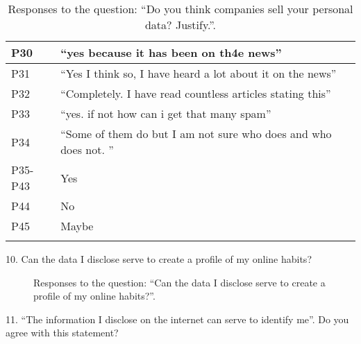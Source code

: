 \begin{longtable}{p{3cm} p{13cm}}
    \hline
    P30 & ``yes because it has been on th4e news'' \\
    \hline
    P31 & ``Yes I think so, I have heard a lot about it on the news'' \\
    \hline
    P32 & ``Completely. I have read countless articles stating this'' \\
    \hline
    P33 & ``yes. if not how can i get that many spam'' \\
    \hline
    P34 & ``Some of them do but I am not sure who does and who does not. '' \\
    \hline
    P35-P43 & Yes \\
    \hline
    P44 & No \\
    \hline
    P45 & Maybe \\
    \hline
    \caption*{Responses to the question: ``Do you think companies sell your personal data? Justify.''.}
    \label{table:survey_s5_q9}
\end{longtable}

\vspace{2cm}

10. Can the data I disclose serve to create a profile of my online habits?

\begin{figure}[H]
    \begin{center}
        \caption*{Responses to the question: ``Can the data I disclose serve to create a profile of my online habits?''.}
        \label{fig:survey_s5_q10}
    \end{center}
\end{figure}

\clearpage

11. ``The information I disclose on the internet can serve to identify me''. Do you agree with this statement?

